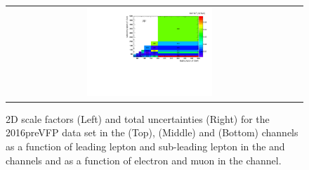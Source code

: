 \begin{figure}[htb]
\begin{center}
\begin{tabular}{cc}
      \includegraphics[width=0.45\textwidth]{fig_2016preVFP_TrigSF/h2D_lepABpt_mumu_BinErrors.pdf}\\
    \end{tabular}
    \caption{2D scale factors (Left) and total uncertainties (Right) for the 2016preVFP data set in the \emu (Top), \ee (Middle) and \mumu (Bottom) channels as a function of leading lepton \pT and sub-leading lepton \pT in the \ee and \mumu channels and as a function of electron \pT and muon \pT in the \emu channel.}
    \label{TrigSF_2016preVFP_4}
  \end{center}
\end{figure}

